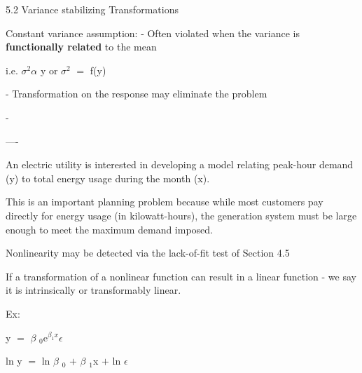 \documentclass[10pt]{extarticle}
\newcommand{\mt}[1]{\ensuremath{#1}}
\newcommand{\ep}{\mt{\epsilon} }         %
\newcommand{\afa}{\mt{\alpha} }
\newcommand{\bta}{\mt{\beta} }
\newcommand{\ps}{\mt{\operatorname{+}} }
\newcommand{\eql}{ \mt{\operatorname{=}} }
\newcommand{\uw}[2]{#1\mt{_{#2}}}
\newcommand{\uf}[2]{#1\mt{^{#2}}}
\newcommand{\txt}[1]{\text{#1}} %
\newcommand{\ssq}{\mt{\sigma^2}}
\newcommand{\exv}[1]{\txt{E[}#1\txt{]}}
\begin{document}
5.2 Variance stabilizing Transformations

Constant variance assumption:
- Often violated when the variance is \textbf{functionally related} to the mean

i.e. \ssq \afa \exv{y} or \ssq \eql f(\exv{y})

- Transformation on the response may eliminate the problem

- 

----

An electric utility is interested in developing a model relating peak-hour demand (y) to total energy usage during the month (x).

This is an important planning problem because while most customers pay directly for energy usage (in kilowatt-hours), the generation system must be large enough to meet the maximum demand imposed.


Nonlinearity may be detected via the lack-of-fit test of Section 4.5

If a transformation of a nonlinear function can result in a linear function - we say it is intrinsically or transformably linear.

Ex:

y \eql \uw{\bta}{0}\uf{e}{\bta_1x}\ep 

ln y \eql ln \uw{\bta}{0} \ps \uw{\bta}{1}x \ps ln \ep
\end{document}
